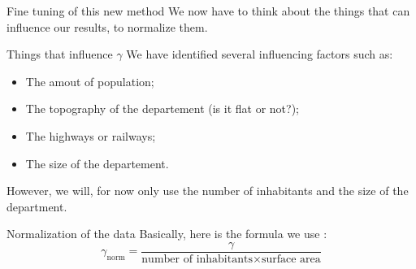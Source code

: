\begin{frame}{Fine tuning of this new method}
    We now have to think about the things that can influence our results, to normalize them.

    \begin{block}{Things that influence $\gamma$}
        We have identified several influencing factors such as:
        \begin{itemize}
            \item The amout of population;
            \item The topography of the departement (is it flat or not?);
            \item The highways or railways;
            \item The size of the departement. 
        \end{itemize}

        However, we will, for now only use the number of inhabitants and the size of the department.
    \end{block}

    \begin{block}{Normalization of the data}
        Basically, here is the formula we use :
        $$
            \gamma_{\text{norm}} = \frac{\gamma}{\text{number of inhabitants}\times\text{surface area}}
        $$
    \end{block}
\end{frame}

